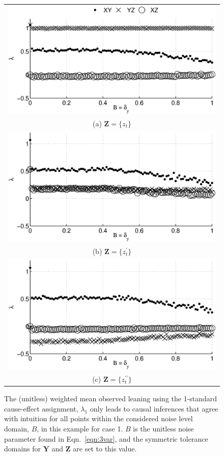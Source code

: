 \documentclass[twocolumn,aps,pre,groupedaddress]{revtex4-1}
\begin{document}
\begin{figure}[ht]
\begin{tabular}{c}
\includegraphics[scale=0.40]{XYZIRexample_Bxytol.eps} \\ 
(a) $\mathbf{Z} = \{z_t\}$ \\
\includegraphics[scale=0.40]{XYZIRexample_BxytolZXandY.eps} \\
(b) $\mathbf{Z} = \{z^\prime_t\}$ \\
\includegraphics[scale=0.40]{XYZIRexample_BxytolZXandYandZ.eps} \\
(c) $\mathbf{Z} = \{z^{\prime\prime}_t\}$\\
\end{tabular}
\caption{The (unitless) weighted mean observed leaning using the 1-standard cause-effect assignment, $\lambda_1$ only leads to causal inferences that agree with intuition for all points within the considered noise level domain, $B$, in this example for case 1.  $B$ is the unitless noise parameter found in Eqn.\ \ref{eqn:3var}, and the symmetric tolerance domains for $\mathbf{Y}$ and $\mathbf{Z}$ are set to this value.}
\label{fig:3var}
\end{figure}
\end{document}
